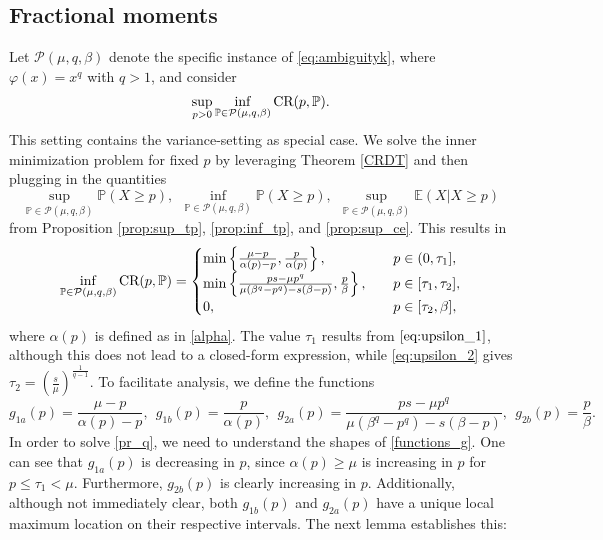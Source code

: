 \documentclass[11pt]{article}
\newcommand{\bP}{\mathbb{P}}
\newcommand{\cP}{\mathcal{P}}
\newcommand{\bE}{\mathbb{E}}
\newcommand{\1}{\mathds{1}}
\begin{document}
\subsection{Fractional moments}\label{sec:frac}
Let $\cP(\mu,q,\beta)$ denote the specific instance of \eqref{eq:ambiguityk}, where $\varphi(x) = x^q$ with $q > 1$, and consider 
\begin{align}\label{pr_q}
\sup_{p>0}\inf_{\bP\in\cP(\mu,q,\beta)}\textup{CR}(p,\bP).
\end{align}
This setting contains the variance-setting as special case. We solve the inner minimization problem for fixed $p$ by leveraging Theorem \ref{CRDT} and then plugging in the quantities $$\sup_{\bP\in\cP(\mu,q,\beta)}\bP(X\geq p), \ \ \inf_{\bP\in\cP(\mu,q,\beta)}\bP(X\geq p), \ \ \sup_{\bP\in\cP(\mu,q,\beta)}\bE(X|X\geq p)$$ from Proposition \ref{prop:sup_tp}, \ref{prop:inf_tp}, and \ref{prop:sup_ce}. This results in
\begin{equation}\label{inner_solution}
    \inf_{\bP\in \cP(\mu,q,\beta)} \textup{CR}(p,\bP) =\begin{cases}
     \min\left\{\frac{\mu-p}{\alpha(p)-p},\frac{p}{\alpha(p)}\right\}, \quad & p\in(0,\tau_1], \\
     \min\left\{\frac{ps-\mu p^q}{\mu(\beta^q-p^q)-s(\beta-p)},\frac{p}{\beta}\right\}, \quad &  p\in[\tau_1,\tau_2], \\
    0, & p \in[\tau_2,\beta],
    \end{cases}
\end{equation}
where $\alpha(p)$ is defined as in \eqref{alpha}. The value $\tau_1$ results from $\eqref{eq:upsilon_1}$, although this does not lead to a closed-form expression, while \eqref{eq:upsilon_2} gives $\tau_2 = (\frac{s}{\mu})^{\frac{1}{q-1}}$. 
To facilitate analysis, we define the functions
\begin{equation}\label{functions_g}
    g_{1a}(p) = \frac{\mu-p}{\alpha(p)-p},\ \ g_{1b}(p) = \frac{p}{\alpha(p)},\ \ g_{2a}(p) = \frac{ps-\mu p^q}{\mu(\beta^q-p^q)-s(\beta-p)}, \ \ g_{2b}(p) = \frac{p}{\beta}.
\end{equation}
In order to solve \eqref{pr_q}, we need to understand the shapes of \eqref{functions_g}.
One can see that $g_{1a}(p)$ is decreasing in $p$, since $\alpha(p) \geq \mu$ is increasing in $p$ for $p\leq \tau_1<\mu$. Furthermore, $g_{2b}(p)$ is clearly increasing in $p$. Additionally, although not immediately clear, both $g_{1b}(p)$ and $g_{2a}(p)$ have a unique local maximum location on their respective intervals. The next lemma establishes this:
\end{document}
